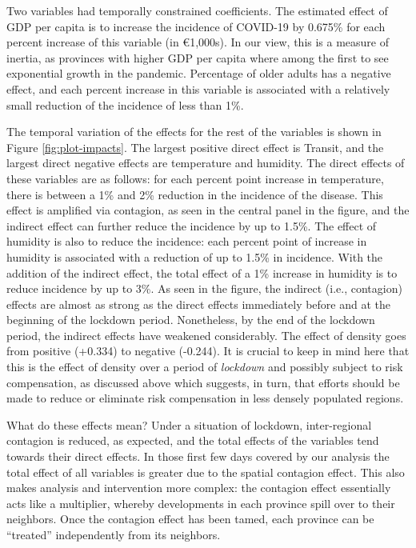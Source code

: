 \documentclass[]{elsarticle} %
\begin{document}
Two variables had temporally constrained coefficients. The estimated
effect of GDP per capita is to increase the incidence of COVID-19 by
0.675\% for each percent increase of this variable (in €1,000s). In our
view, this is a measure of inertia, as provinces with higher GDP per
capita where among the first to see exponential growth in the pandemic.
Percentage of older adults has a negative effect, and each percent
increase in this variable is associated with a relatively small
reduction of the incidence of less than 1\%.

The temporal variation of the effects for the rest of the variables is
shown in Figure \ref{fig:plot-impacts}. The largest positive direct
effect is Transit, and the largest direct negative effects are
temperature and humidity. The direct effects of these variables are as
follows: for each percent point increase in temperature, there is
between a 1\% and 2\% reduction in the incidence of the disease. This
effect is amplified via contagion, as seen in the central panel in the
figure, and the indirect effect can further reduce the incidence by up
to 1.5\%. The effect of humidity is also to reduce the incidence: each
percent point of increase in humidity is associated with a reduction of
up to 1.5\% in incidence. With the addition of the indirect effect, the
total effect of a 1\% increase in humidity is to reduce incidence by up
to 3\%. As seen in the figure, the indirect (i.e., contagion) effects
are almost as strong as the direct effects immediately before and at the
beginning of the lockdown period. Nonetheless, by the end of the
lockdown period, the indirect effects have weakened considerably. The
effect of density goes from positive (+0.334) to negative (-0.244). It
is crucial to keep in mind here that this is the effect of density over
a period of \emph{lockdown} and possibly subject to risk compensation,
as discussed above which suggests, in turn, that efforts should be made
to reduce or eliminate risk compensation in less densely populated
regions.

What do these effects mean? Under a situation of lockdown,
inter-regional contagion is reduced, as expected, and the total effects
of the variables tend towards their direct effects. In those first few
days covered by our analysis the total effect of all variables is
greater due to the spatial contagion effect. This also makes analysis
and intervention more complex: the contagion effect essentially acts
like a multiplier, whereby developments in each province spill over to
their neighbors. Once the contagion effect has been tamed, each province
can be ``treated'' independently from its neighbors.
\end{document}
